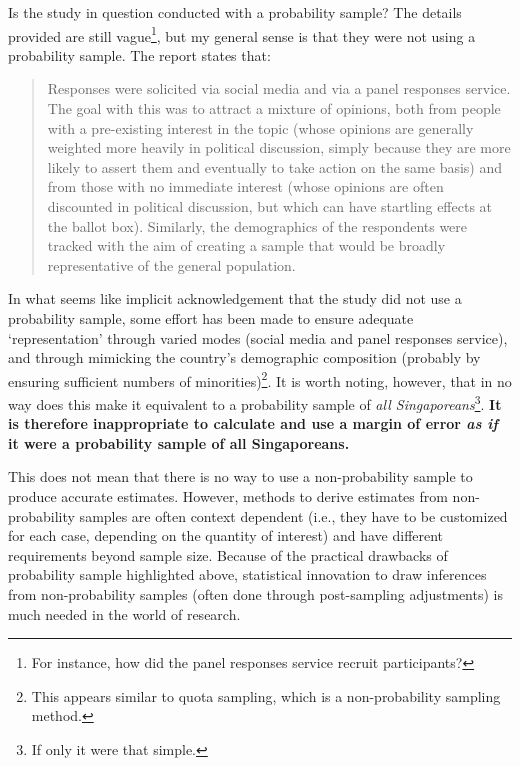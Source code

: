 \documentclass[openany]{book}
\let\rmarkdownfootnote\footnote%
\def\footnote{\protect\rmarkdownfootnote}
\begin{document}
Is the study in question conducted with a probability sample? The
details provided are still vague\footnote{For instance, how did the
  panel responses service recruit participants?}, but my general sense
is that they were not using a probability sample. The report states
that:

\begin{quote}
Responses were solicited via social media and via a panel responses
service. The goal with this was to attract a mixture of opinions, both
from people with a pre-existing interest in the topic (whose opinions
are generally weighted more heavily in political discussion, simply
because they are more likely to assert them and eventually to take
action on the same basis) and from those with no immediate interest
(whose opinions are often discounted in political discussion, but which
can have startling effects at the ballot box). Similarly, the
demographics of the respondents were tracked with the aim of creating a
sample that would be broadly representative of the general population.
\end{quote}

In what seems like implicit acknowledgement that the study did not use a
probability sample, some effort has been made to ensure adequate
`representation' through varied modes (social media and panel responses
service), and through mimicking the country's demographic composition
(probably by ensuring sufficient numbers of minorities)\footnote{This
  appears similar to quota sampling, which is a non-probability sampling
  method.}. It is worth noting, however, that in no way does this make
it equivalent to a probability sample of \emph{all
Singaporeans}\footnote{If only it were that simple.}. \textbf{It is
therefore inappropriate to calculate and use a margin of error \emph{as
if} it were a probability sample of all Singaporeans.}

This does not mean that there is no way to use a non-probability sample
to produce accurate estimates. However, methods to derive estimates from
non-probability samples are often context dependent (i.e., they have to
be customized for each case, depending on the quantity of interest) and
have different requirements beyond sample size. Because of the practical
drawbacks of probability sample highlighted above, statistical
innovation to draw inferences from non-probability samples (often done
through post-sampling adjustments) is much needed in the world of
research.
\end{document}
